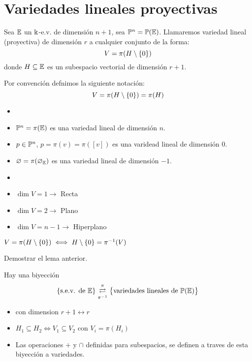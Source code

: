 \section{Variedades lineales proyectivas}

\begin{defi}
    Sea $\mathbb{E}$ un $\Bbbk$-e.v. de dimensión $n+1$, sea $\mathbb{P}^n = \mathbb{P}(\mathbb{E})$.
    Llamaremos variedad lineal (proyectiva) de dimensión $r$ a cualquier conjunto
    de la forma:
    \[V = \pi(H \setminus \left\{0\right\})\]
    donde $H \subseteq \mathbb{E}$ es un subespacio vectorial de dimensión $r+1$.

    Por convención defnimos la siguiente notación:
    \[V = \pi(H \setminus \left\{0\right\}) = \pi(H)\]
\end{defi}
\begin{example}
    \begin{itemize}
        \item []
        \item $\mathbb{P}^n = \pi(\mathbb{E})$ es una variedad lineal de dimensión $n$.
        \item $p \in \mathbb{P}^n$, $p = \pi(v) = \pi([v])$ es una varidead lineal de dimensión $0$.
        \item $\varnothing = \pi({\varnothing_{\mathbb{E}}})$ es una variedad lineal de dimensión $-1$.
    \end{itemize}
\end{example}
\begin{defi*}
    \begin{itemize}
        \item []
        \item $\dim V = 1 \longrightarrow$ Recta
        \item $\dim V = 2 \longrightarrow$ Plano
        \item $\dim V = n-1 \longrightarrow$ Hiperplano
    \end{itemize}
\end{defi*}
\begin{lema}
    $V = \pi(H\setminus\left\{0\right\}) \iff H \setminus \left\{0\right\} = \pi^{-1}(V)$
\end{lema}
\begin{ej}
    Demostrar el lema anterior.
\end{ej}
\begin{obs}
    Hay una biyección
    \[\left\{\text{s.e.v. de } \mathbb{E}\right\}
    \mathrel{\mathop{\rightleftarrows}^{\mathrm{\pi}}_{\mathrm{\pi^{-1}}}}
    \left\{\text{variedades lineales de } \mathbb{P}(\mathbb{E})\right\}\]
    \begin{itemize}
        \item con dimension $r+1 \leftrightarrow r$
        \item $H_1 \subseteq H_2 \iff V_1 \subseteq V_2$ con $V_i=\pi(H_i)$
        \item Las operaciones $+$ y $\cap$ definidas para subespacios, se definen
        a traves de esta biyección a variedades.
    \end{itemize}
\end{obs}
